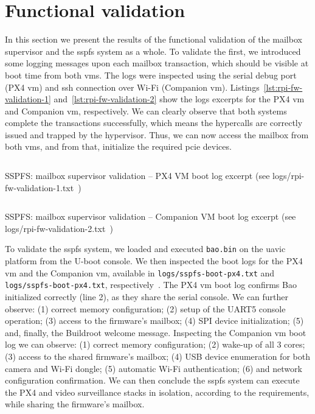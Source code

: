 \section{Functional validation}
\label{sec:functional-validation}
In this section we present the results of the functional validation of the
mailbox supervisor and the \gls{sspfs} system as a whole. To validate the first,
we introduced some logging messages upon each mailbox transaction, which should
be visible at boot time from both \glspl{vm}. The logs were inspected using the
serial debug port (PX4 \gls{vm}) and \gls{ssh} connection over Wi-Fi (Companion \gls{vm}).
%
Listings~\ref{lst:rpi-fw-validation-1} and~\ref{lst:rpi-fw-validation-2} show
the logs excerpts for the PX4 \gls{vm} and Companion \gls{vm}, respectively. We can
clearly observe that both systems complete the transactions successfully, which
means the hypercalls are correctly issued and trapped by the hypervisor. Thus,
we can now access the mailbox from both \glspl{vm}, and from that, initialize
the required \gls{pcie} devices.

\begin{longlisting}
\centering
\inputminted[]{kconfig}{./listing/rpi-fw-validation-1.txt}
\caption[SSPFS: mailbox supervisor validation -- PX4 VM boot log
(excerpt)]{SSPFS: mailbox supervisor validation -- PX4 VM boot log excerpt (see logs/rpi-fw-validation-1.txt~\cite{thesis-sw-github})}
\label{lst:rpi-fw-validation-1}
\end{longlisting}

\begin{longlisting}
\centering
\inputminted[]{kconfig}{./listing/rpi-fw-validation-2.txt}
\caption[SSPFS: mailbox supervisor validation -- Companion VM boot log
(excerpt)]{SSPFS: mailbox supervisor validation -- Companion VM boot log excerpt (see logs/rpi-fw-validation-2.txt~\cite{thesis-sw-github})}
\label{lst:rpi-fw-validation-2}
\end{longlisting}

To validate the \gls{sspfs} system, we loaded and executed \lstinline{bao.bin}
on the \gls{uavic} platform from the U-boot console.
We then inspected the boot logs for the PX4 \gls{vm} and the Companion \gls{vm},
available in \lstinline{logs/sspfs-boot-px4.txt} and
\lstinline{logs/sspfs-boot-px4.txt}, respectively~\cite{thesis-sw-github}.
The PX4 \gls{vm} boot log confirms Bao initialized correctly (line 2), as they
share the serial console. We can further observe: (1) correct memory
configuration; (2) setup of the UART5 console operation; (3) access to the
firmware's mailbox; (4) SPI device initialization; (5) and, finally, the Buildroot
welcome message. Inspecting the Companion \gls{vm} boot log we can observe: (1)
correct memory configuration; (2) wake-up of all 3 cores; (3) access to the
shared firmware's mailbox; (4) USB device enumeration for both camera and Wi-Fi
dongle; (5) automatic Wi-Fi authentication; (6) and network configuration
confirmation. We can then conclude the \gls{sspfs} system can execute the PX4
and video surveillance stacks in isolation, according to the requirements, while
sharing the firmware's mailbox.

